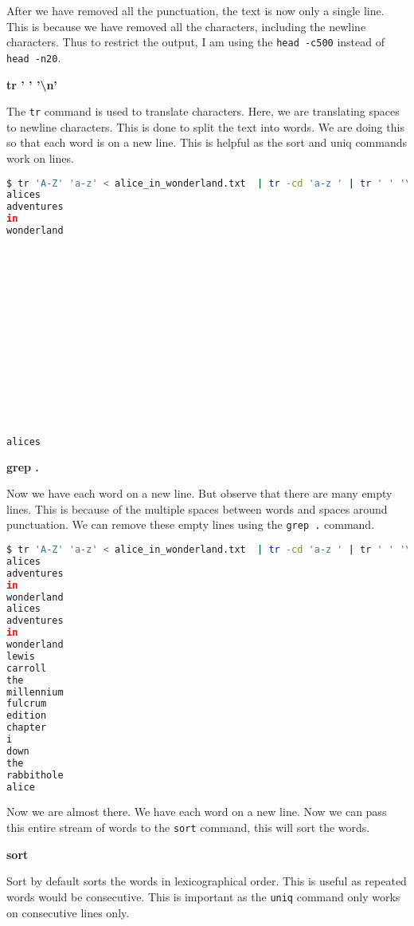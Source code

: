 \begin{remark}
  After we have removed all the punctuation, the text is now
  only a single line. This is because we have removed all the
  characters, including the newline characters.
  Thus to restrict the output, I am using the \texttt{head -c500}
  instead of \texttt{head -n20}.
\end{remark}

\textbf{tr ' ' '\textbackslash n'}

The \texttt{tr} command is used to translate characters. Here, we are
translating spaces to newline characters. This is done to split the
text into words. We are doing this so that each word is on a new line.
This is helpful as the sort and uniq commands work on lines.

\begin{lstlisting}[language=bash]
$ tr 'A-Z' 'a-z' < alice_in_wonderland.txt  | tr -cd 'a-z ' | tr ' ' '\n' | head -20
alices
adventures
in
wonderland















alices
\end{lstlisting}

\textbf{grep .}

Now we have each word on a new line.
But observe that there are many empty lines.
This is because of the multiple spaces between words and spaces around
punctuation. We can remove these empty lines using the \texttt{grep .}
command.

\begin{lstlisting}[language=bash]
$ tr 'A-Z' 'a-z' < alice_in_wonderland.txt  | tr -cd 'a-z ' | tr ' ' '\n' | grep . | head -20
alices
adventures
in
wonderland
alices
adventures
in
wonderland
lewis
carroll
the
millennium
fulcrum
edition
chapter
i
down
the
rabbithole
alice
\end{lstlisting}

Now we are almost there. We have each word on a new line. Now we can
pass this entire stream of words to the \texttt{sort} command, this
will sort the words.

\textbf{sort}

Sort by default sorts the words in lexicographical order. This is
useful as repeated words would be consecutive. This is important
as the \texttt{uniq} command only works on consecutive lines only.

